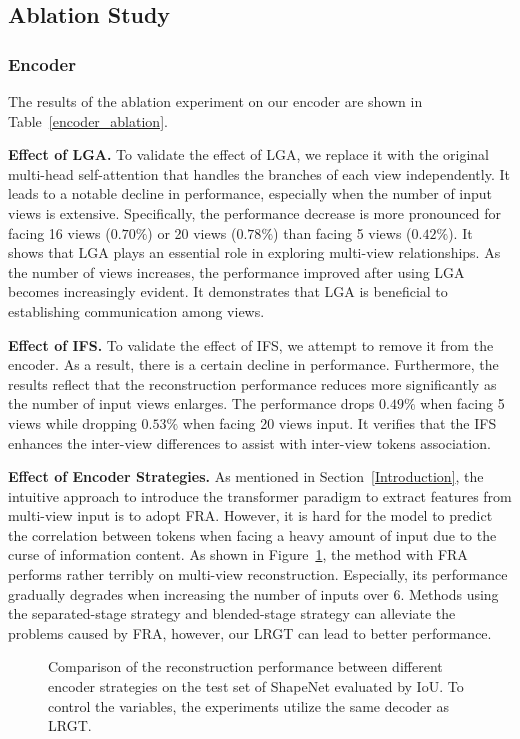 \documentclass[10pt,twocolumn,letterpaper]{article}
\begin{document}
\subsection{Ablation Study}
\label{experiments::ablation}
\subsubsection{Encoder}
The results of the ablation experiment on our encoder are shown in Table~\ref{encoder_ablation}.

\textbf{Effect of LGA.} To validate the effect of LGA, we replace it with the original multi-head self-attention that handles the branches of each view independently. It leads to a notable decline in performance, especially when the number of input views is extensive. Specifically, the performance decrease is more pronounced for facing 16 views ($0.70\%$) or 20 views ($0.78\%$) than facing 5 views ($0.42\%$). It shows that LGA plays an essential role in exploring multi-view relationships. As the number of views increases, the performance improved after using LGA becomes increasingly evident. It demonstrates that LGA is beneficial to establishing communication among views.

\textbf{Effect of IFS.} To validate the effect of IFS, we attempt to remove it from the encoder. As a result, there is a certain decline in performance. Furthermore, the results reflect that the reconstruction performance reduces more significantly as the number of input views enlarges. The performance drops $0.49\%$ when facing 5 views while dropping $0.53\%$ when facing 20 views input. It verifies that the IFS enhances the inter-view differences to assist with inter-view tokens association. 


\textbf{Effect of Encoder Strategies.} As mentioned in Section~\ref{Introduction}, the intuitive approach to introduce the transformer paradigm to extract features from multi-view input is to adopt FRA. However, it is hard for the model to predict the correlation between tokens when facing a heavy amount of input due to the curse of information content. As shown in Figure~\ref{strategy2}, the method with FRA performs rather terribly on multi-view reconstruction. Especially, its performance gradually degrades when increasing the number of inputs over 6. Methods using the separated-stage strategy and blended-stage strategy can alleviate the problems caused by FRA, however, our LRGT can lead to better performance.


\begin{figure}[t]
	\centering
	\caption{Comparison of the reconstruction performance between different encoder strategies on the test set of ShapeNet evaluated by IoU. To control the variables, the experiments utilize the same decoder as LRGT.}
	\label{strategy2}
\end{figure}
\end{document}
